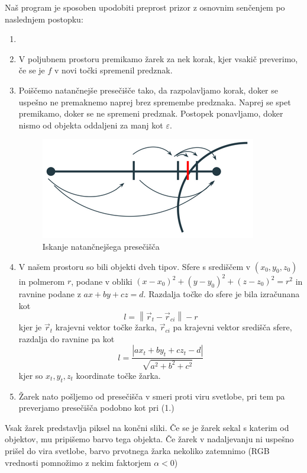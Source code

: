 \documentclass[titlepage]{article}
\begin{document}
Naš program je sposoben upodobiti preprost prizor z osnovnim senčenjem po naslednjem postopku:
\newline
\bigskip
\begin{enumerate}
  \item 
\item V poljubnem prostoru premikamo žarek za nek korak, kjer vsakič preverimo, če se je $f$ v novi točki spremenil predznak.
\item Poiščemo natančnejše presečišče tako, da razpolavljamo korak, doker se uspešno ne premaknemo naprej brez spremembe predznaka. Naprej se spet premikamo, doker se ne spremeni predznak. Postopek ponavljamo, doker nismo od objekta oddaljeni za manj kot $\varepsilon$.
\begin{figure}[H]
    \centering
    \includegraphics[width=0.5\linewidth]{intersect.png}
    \caption{Iskanje natančnejšega presečišča}
    \label{Slika:Iskanje natančnejšega presečišča}
\end{figure}
\item[] V našem prostoru so bili objekti dveh tipov. Sfere s središčem v $(x_{0}, y_{0}, z_{0})$ in polmerom $r$, podane v obliki $(x-x_{0})^{2}+(y-y_{0})^{2}+(z-z_{0})^{2}=r^{2}$ in ravnine podane z $ax+by+cz=d$. Razdalja točke do sfere je bila izračunana kot
\begin{equation} \label{e:distSphere}
    l=\left \| \vec{r}_{t}-\vec{r}_{ci} \right \| - r
\end{equation}
kjer je $\vec{r}_{t}$ krajevni vektor točke žarka, $\vec{r}_{ci}$ pa krajevni vektor središča sfere, razdalja do ravnine pa kot
\begin{equation} \label{e:distPlane}
    l=\frac{\left | ax_{t}+by_{t}+cz_{t}-d \right |}{\sqrt{a^{2}+b^{2}+c^{2}}}
\end{equation}
kjer so $x_{t}, y_{t}, z_{t}$ koordinate točke žarka.
\item Žarek nato pošljemo od presečišča v smeri proti viru svetlobe, pri tem pa preverjamo presečišča podobno kot pri (1.)
\end{enumerate}
Vsak žarek predstavlja piksel na končni sliki. Če se je žarek sekal s katerim od objektov, mu pripišemo barvo tega objekta. Če žarek v nadaljevanju ni uspešno prišel do vira svetlobe, barvo prvotnega žarka nekoliko zatemnimo (RGB vrednosti pomnožimo z nekim faktorjem $\alpha < 0$)
\end{document}

